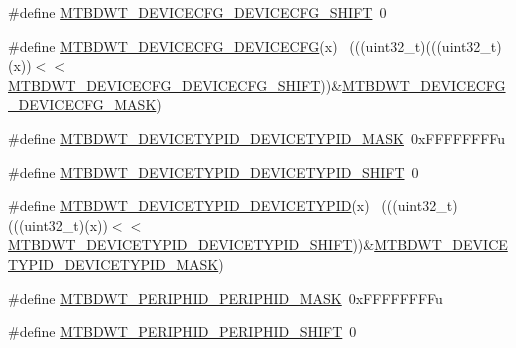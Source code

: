 \begin{DoxyCompactItemize}
\item 
\#define \hyperlink{group___m_t_b_d_w_t___register___masks_ga2194cb4b21ad650bf3957d3f95f4dbbb}{M\+T\+B\+D\+W\+T\+\_\+\+D\+E\+V\+I\+C\+E\+C\+F\+G\+\_\+\+D\+E\+V\+I\+C\+E\+C\+F\+G\+\_\+\+S\+H\+I\+FT}~0
\item 
\#define \hyperlink{group___m_t_b_d_w_t___register___masks_ga150a8008c2ca6200e701bcd7f3aa6a5c}{M\+T\+B\+D\+W\+T\+\_\+\+D\+E\+V\+I\+C\+E\+C\+F\+G\+\_\+\+D\+E\+V\+I\+C\+E\+C\+FG}(x)                    ~(((uint32\+\_\+t)(((uint32\+\_\+t)(x))$<$$<$\hyperlink{group___m_t_b_d_w_t___register___masks_ga2194cb4b21ad650bf3957d3f95f4dbbb}{M\+T\+B\+D\+W\+T\+\_\+\+D\+E\+V\+I\+C\+E\+C\+F\+G\+\_\+\+D\+E\+V\+I\+C\+E\+C\+F\+G\+\_\+\+S\+H\+I\+FT}))\&\hyperlink{group___m_t_b_d_w_t___register___masks_ga90daa5cb85d4d39b819f5c9bc1b20546}{M\+T\+B\+D\+W\+T\+\_\+\+D\+E\+V\+I\+C\+E\+C\+F\+G\+\_\+\+D\+E\+V\+I\+C\+E\+C\+F\+G\+\_\+\+M\+A\+SK})
\item 
\#define \hyperlink{group___m_t_b_d_w_t___register___masks_ga6986bcf237d6ff96e25d6458355ef4b8}{M\+T\+B\+D\+W\+T\+\_\+\+D\+E\+V\+I\+C\+E\+T\+Y\+P\+I\+D\+\_\+\+D\+E\+V\+I\+C\+E\+T\+Y\+P\+I\+D\+\_\+\+M\+A\+SK}~0x\+F\+F\+F\+F\+F\+F\+F\+Fu
\item 
\#define \hyperlink{group___m_t_b_d_w_t___register___masks_ga8caaff8277e4bdaee5735e22d6eb6e7c}{M\+T\+B\+D\+W\+T\+\_\+\+D\+E\+V\+I\+C\+E\+T\+Y\+P\+I\+D\+\_\+\+D\+E\+V\+I\+C\+E\+T\+Y\+P\+I\+D\+\_\+\+S\+H\+I\+FT}~0
\item 
\#define \hyperlink{group___m_t_b_d_w_t___register___masks_ga1fc0af455274786a5c7eaca60cca8792}{M\+T\+B\+D\+W\+T\+\_\+\+D\+E\+V\+I\+C\+E\+T\+Y\+P\+I\+D\+\_\+\+D\+E\+V\+I\+C\+E\+T\+Y\+P\+ID}(x)            ~(((uint32\+\_\+t)(((uint32\+\_\+t)(x))$<$$<$\hyperlink{group___m_t_b_d_w_t___register___masks_ga8caaff8277e4bdaee5735e22d6eb6e7c}{M\+T\+B\+D\+W\+T\+\_\+\+D\+E\+V\+I\+C\+E\+T\+Y\+P\+I\+D\+\_\+\+D\+E\+V\+I\+C\+E\+T\+Y\+P\+I\+D\+\_\+\+S\+H\+I\+FT}))\&\hyperlink{group___m_t_b_d_w_t___register___masks_ga6986bcf237d6ff96e25d6458355ef4b8}{M\+T\+B\+D\+W\+T\+\_\+\+D\+E\+V\+I\+C\+E\+T\+Y\+P\+I\+D\+\_\+\+D\+E\+V\+I\+C\+E\+T\+Y\+P\+I\+D\+\_\+\+M\+A\+SK})
\item 
\#define \hyperlink{group___m_t_b_d_w_t___register___masks_gaa49f29267dcedd6db6aafce7b226182b}{M\+T\+B\+D\+W\+T\+\_\+\+P\+E\+R\+I\+P\+H\+I\+D\+\_\+\+P\+E\+R\+I\+P\+H\+I\+D\+\_\+\+M\+A\+SK}~0x\+F\+F\+F\+F\+F\+F\+F\+Fu
\item 
\#define \hyperlink{group___m_t_b_d_w_t___register___masks_gaa9dfe45d3ebe7c1496f24e1b898ae6a5}{M\+T\+B\+D\+W\+T\+\_\+\+P\+E\+R\+I\+P\+H\+I\+D\+\_\+\+P\+E\+R\+I\+P\+H\+I\+D\+\_\+\+S\+H\+I\+FT}~0

\end{DoxyCompactItemize}

